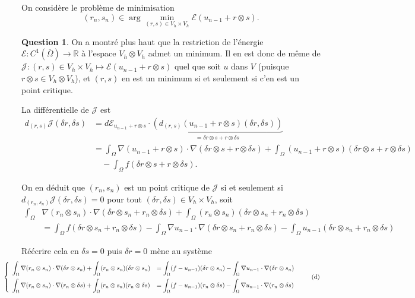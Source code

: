 \documentclass[11pt]{article}
\newcommand{\RR}{\mathbb{R}}
\theoremstyle{definition}
\newtheorem{ques}{Question}
\begin{document}
On considère le problème de minimisation
\begin{equation}\label{eq:5}
(r_n,s_n) \in \arg\min_{(r,s)\in V_h\times V_h} \mathcal{E}(u_{n-1}+r\otimes s).
\end{equation}


\begin{ques}
On a montré plus haut que la restriction de l'énergie $\mathcal{E}:C^1(\overline{\Omega})\longrightarrow \RR$ à l'espace $V_h\otimes V_h$ admet un minimum. Il en est donc de même de $\mathcal J:(r,s)\in V_h\times V_h\longmapsto \mathcal{E}(u_{n-1} + r\otimes s)$ quel que soit $u$ dans $V$ (puisque $r\otimes s\in V_h\otimes V_h$), et $(r,s)$ en est un minimum si et seulement si c'en est un point critique.

La différentielle de $\mathcal{J}$ est
\begin{align*}
d_{(r,s)}\mathcal J(\delta r,\delta s) 
&= d\mathcal{E}_{u_{n-1}+r\otimes s}\cdot
\underbrace{\left(
d_{(r,s)}(u_{n-1}+r\otimes s)(\delta r,\delta s)\right)
}_{= \delta r\otimes s + r\otimes\delta s} \\
&= \int_\Omega \nabla(u_{n-1}+r\otimes s)\cdot\nabla(\delta r\otimes s + r\otimes\delta s)
+ \int_\Omega (u_{n-1}+r\otimes s)(\delta r\otimes s + r\otimes\delta s)
\\ &\quad - \int_\Omega f(\delta r\otimes s + r\otimes\delta s).
\end{align*}

On en déduit que $(r_n,s_n)$ est un point critique de $\mathcal{J}$ si et seulement si $d_{(r_n,s_n)}\mathcal{J}(\delta r,\delta s) = 0$ pour tout $(\delta r,\delta s)\in V_h\times V_h$, soit
\begin{align}\label{eq:6}
\int_\Omega &\nabla(r_n\otimes s_n)\cdot\nabla(\delta r\otimes s_n + r_n\otimes \delta s) + \int_\Omega (r_n\otimes s_n)(\delta r\otimes s_n + r_n\otimes \delta s) \nonumber \\
&=\int_\Omega f(\delta r\otimes s_n + r_n\otimes\delta s) - \int_\Omega \nabla u_{n-1}\cdot\nabla(\delta r\otimes s_n + r_n\otimes\delta s) - \int_\Omega u_{n-1}(\delta r\otimes s_n + r_n\otimes\delta s)
\end{align}

Réécrire cela en $\delta s=0$ puis $\delta r=0$ mène au système 
\begin{equation}\hspace*{-1cm}
\left\{
\begin{array}{*2{>{\displaystyle}l}}
\int_\Omega \nabla(r_n\otimes s_n)\cdot\nabla(\delta r\otimes s_n) + \int_\Omega (r_n\otimes s_n)(\delta r\otimes s_n) 
&= \int_\Omega (f-u_{n-1})(\delta r\otimes s_n) - \int_\Omega \nabla u_{n-1}\cdot\nabla(\delta r\otimes s_n) \\[1em]
\int_\Omega \nabla(r_n\otimes s_n)\cdot\nabla(r_n\otimes\delta s) + \int_\Omega (r_n\otimes s_n)(r_n\otimes\delta s) 
&= \int_\Omega (f-u_{n-1})(r_n\otimes \delta s) - \int_\Omega \nabla u_{n-1}\cdot\nabla(r_n\otimes\delta s)
\end{array}\right.\tag{d}\label{eq:d}
\end{equation}


\end{ques}
\end{document}
